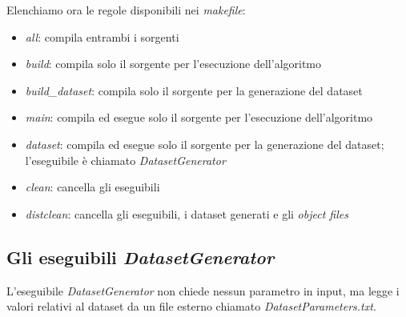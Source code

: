 \documentclass[a4paper,12pt]{report}							%
\begin{document}
Elenchiamo ora le regole disponibili nei \textit{makefile}:
\begin{itemize}
 \item \textit{all}: compila entrambi i sorgenti
 \item \textit{build}: compila solo il sorgente per l'esecuzione dell'algoritmo
 \item \textit{build\_dataset}: compila solo il sorgente per la generazione del dataset
 \item \textit{main}: compila ed esegue solo il sorgente per l'esecuzione dell'algoritmo
 \item \textit{dataset}: compila ed esegue solo il sorgente per la generazione del dataset; l'eseguibile è chiamato 
 \textit{DatasetGenerator}
 \item \textit{clean}: cancella gli eseguibili
 \item \textit{distclean}: cancella gli eseguibili, i dataset generati e gli \textit{object files}
\end{itemize}

\subsection{Gli eseguibili \textit{DatasetGenerator}}
L'eseguibile \textit{DatasetGenerator} non chiede nessun parametro in input, ma legge i valori relativi al
dataset da un file esterno chiamato \textit{DatasetParameters.txt}.
\end{document}
